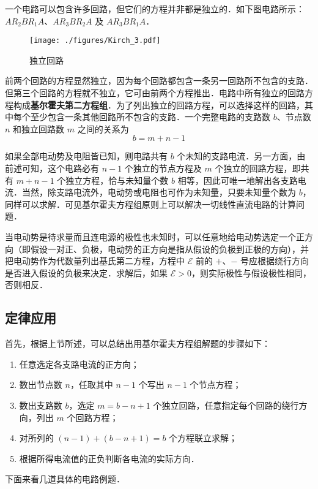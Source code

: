 一个电路可以包含许多回路，但它们的方程并非都是独立的．如下图电路所示：$AR_2BR_1A$、$AR_3BR_2A$ 及 $AR_3BR_1A$．
\begin{figure}[ht]
\centering
\texttt{[image: ./figures/Kirch\_3.pdf]}
\caption{独立回路} \label{Kirch_fig3}
\end{figure}

前两个回路的方程显然独立，因为每个回路都包含一条另一回路所不包含的支路．但第三个回路的方程就不独立，它可由前两个方程推出．电路中所有独立的回路方程构成\textbf{基尔霍夫第二方程组}．为了列出独立的回路方程，可以选择这样的回路，其中每个至少包含一条其他回路所不包含的支路．一个完整电路的支路数 $b$、节点数 $n $ 和独立回路数 $m $ 之间的关系为
\begin{equation}
b=m+n-1
\end{equation}

如果全部电动势及电阻皆已知，则电路共有 $b $ 个未知的支路电流．另一方面，由前述可知，这个电路必有 $n-1 $ 个独立的节点方程及 $m $ 个独立的回路方程，即共有 $m + n -1$ 个独立方程，恰与未知量个数 $b $ 相等，因此可唯一地解出各支路电流．当然，除支路电流外，电动势或电阻也可作为未知量，只要未知量个数为 $b$，同样可以求解．可见基尔霍夫方程组原则上可以解决一切线性直流电路的计算问题．

当电动势是待求量而且连电源的极性也未知时，可以任意地给电动势选定一个正方向（即假设一对正、负极，电动势的正方向是指从假设的负极到正极的方向），并把电动势作为代数量列出基氏第二方程，方程中 $\mathscr E$ 前的 $+$、$-$ 号应根据绕行方向是否进入假设的负极来决定．求解后，如果 $\mathscr E>0$，则实际极性与假设极性相同，否则相反． 

\subsection{定律应用}

首先，根据上节所述，可以总结出用基尔霍夫方程组解题的步骤如下：
\begin{enumerate}
\item 任意选定各支路电流的正方向；
\item 数出节点数 $n$，任取其中 $n-1 $ 个写出 $n - 1 $ 个节点方程；
\item 数出支路数 $b$，选定 $m=b-n+1 $ 个独立回路，任意指定每个回路的绕行方向，列出 $m $ 个回路方程；
\item 对所列的 $(n-1)+(b-n+1)=b $ 个方程联立求解；
\item 根据所得电流值的正负判断各电流的实际方向．
\end{enumerate}

下面来看几道具体的电路例题．


